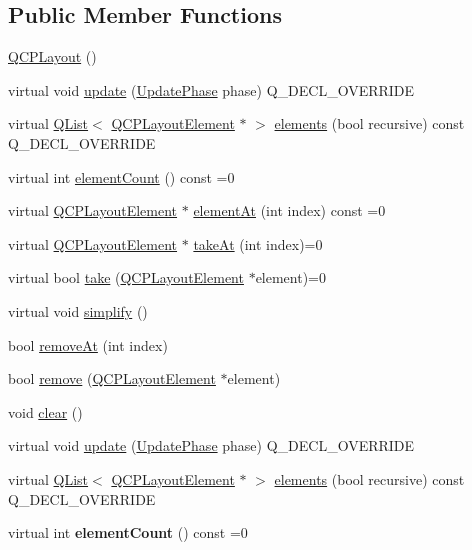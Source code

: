 \subsection*{Public Member Functions}
\begin{DoxyCompactItemize}
\item 
\hyperlink{class_q_c_p_layout_a04222e6e1361fd802d48f1a25b7020d4}{Q\+C\+P\+Layout} ()
\item 
virtual void \hyperlink{class_q_c_p_layout_a48ecc9c98ea90b547c3e27a931a8f7bd}{update} (\hyperlink{class_q_c_p_layout_element_a0d83360e05735735aaf6d7983c56374d}{Update\+Phase} phase) Q\+\_\+\+D\+E\+C\+L\+\_\+\+O\+V\+E\+R\+R\+I\+DE
\item 
virtual \hyperlink{class_q_list}{Q\+List}$<$ \hyperlink{class_q_c_p_layout_element}{Q\+C\+P\+Layout\+Element} $\ast$ $>$ \hyperlink{class_q_c_p_layout_aca129722c019f91d3367046f80abfa77}{elements} (bool recursive) const Q\+\_\+\+D\+E\+C\+L\+\_\+\+O\+V\+E\+R\+R\+I\+DE
\item 
virtual int \hyperlink{class_q_c_p_layout_a39d3e9ef5d9b82ab1885ba1cb9597e56}{element\+Count} () const =0
\item 
virtual \hyperlink{class_q_c_p_layout_element}{Q\+C\+P\+Layout\+Element} $\ast$ \hyperlink{class_q_c_p_layout_afa73ca7d859f8a3ee5c73c9b353d2a56}{element\+At} (int index) const =0
\item 
virtual \hyperlink{class_q_c_p_layout_element}{Q\+C\+P\+Layout\+Element} $\ast$ \hyperlink{class_q_c_p_layout_a5a79621fa0a6eabb8b520cfc04fb601a}{take\+At} (int index)=0
\item 
virtual bool \hyperlink{class_q_c_p_layout_ada26cd17e56472b0b4d7fbbc96873e4c}{take} (\hyperlink{class_q_c_p_layout_element}{Q\+C\+P\+Layout\+Element} $\ast$element)=0
\item 
virtual void \hyperlink{class_q_c_p_layout_a41e6ac049143866e8f8b4964efab01b2}{simplify} ()
\item 
bool \hyperlink{class_q_c_p_layout_a2403f684fee3ce47132faaeed00bb066}{remove\+At} (int index)
\item 
bool \hyperlink{class_q_c_p_layout_a6c58f537d8086f352576ab7c5b15d0bc}{remove} (\hyperlink{class_q_c_p_layout_element}{Q\+C\+P\+Layout\+Element} $\ast$element)
\item 
void \hyperlink{class_q_c_p_layout_a02883bdf2769b5b227f0232dba1ac4ee}{clear} ()
\item 
virtual void \hyperlink{class_q_c_p_layout_a2dd1945e29217de03f27228f596d1304}{update} (\hyperlink{class_q_c_p_layout_element_a0d83360e05735735aaf6d7983c56374d}{Update\+Phase} phase) Q\+\_\+\+D\+E\+C\+L\+\_\+\+O\+V\+E\+R\+R\+I\+DE
\item 
virtual \hyperlink{class_q_list}{Q\+List}$<$ \hyperlink{class_q_c_p_layout_element}{Q\+C\+P\+Layout\+Element} $\ast$ $>$ \hyperlink{class_q_c_p_layout_a15d7ab417316952a13bed428819af690}{elements} (bool recursive) const Q\+\_\+\+D\+E\+C\+L\+\_\+\+O\+V\+E\+R\+R\+I\+DE
\item 
virtual int {\bfseries element\+Count} () const =0\hypertarget{class_q_c_p_layout_acc6012e7dacc55c4282942c31c45b8d9}{}\label{class_q_c_p_layout_acc6012e7dacc55c4282942c31c45b8d9}


\end{DoxyCompactItemize}
